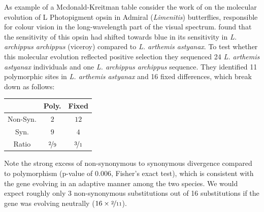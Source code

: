 As example of a Mcdonald-Kreitman table consider the work of \citet{frentiu2007adaptive} on the molecular evolution of L Photopigment opsin in Admiral
({\it Limenitis}) butterflies, responsible for colour vision in the long-wavelength part of the visual spectrum. \citeauthor{frentiu2007adaptive} found that the sensitivity of this opsin had shifted towards blue in its sensitivity in {\it L. archippus archippus} (viceroy) compared to {\it  L. arthemis astyanax}. To test whether this molecular evolution reflected positive selection they sequenced  24 {\it L. arthemis astyanax} individuals and one {\it  L. archippus archippus} sequence. They identified  11 polymorphic sites in  {\it L. arthemis astyanax} and 16 fixed differences, which break down as follows:
\begin{center}
\begin{tabular}{ccc}
 & Poly. & Fixed  \\
 \hline
Non-Syn. &    $2$  &   $12$ \\
Syn. &    $9$   &     $4$  \\
Ratio & $\nicefrac{2}{9}$  & $\nicefrac{3}{1}$
\end{tabular}
\end{center}
Note the strong excess of non-synonymous to synonymous divergence compared to polymorphism (p-value of $0.006$, Fisher's exact test), which is consistent with the gene evolving in an adaptive manner among the two species. We would expect roughly only $3$ non-synonymous substitutions out of 16 substitutions if the gene was evolving neutrally ($ 16 \times \nicefrac{2}{11}$).



